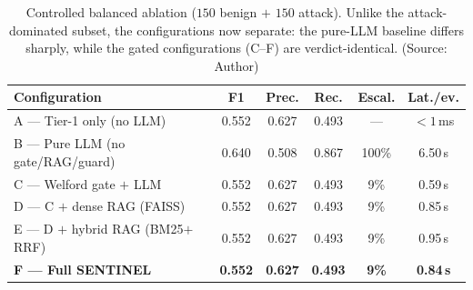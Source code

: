 \begin{table}[!htbp]
    \centering
    \footnotesize
    \setlength{\tabcolsep}{4pt}
    \caption{Controlled balanced ablation ($150$ benign $+$ $150$ attack). Unlike the attack-dominated subset, the configurations now separate: the pure-LLM baseline differs sharply, while the gated configurations (C--F) are verdict-identical. (Source: Author)}
    \label{tab:ablation_balanced}
    \begin{tabular}{|>{\raggedright\arraybackslash}p{}|c|c|c|c|c|}
        \hline
        \textbf{Configuration} & \textbf{F1} & \textbf{Prec.} & \textbf{Rec.} & \textbf{Escal.} & \textbf{Lat./ev.} \\
        \hline
        A --- Tier-1 only (no LLM) & 0.552 & 0.627 & 0.493 & --- & $<1$\,ms \\
        \hline
        B --- Pure LLM (no gate/RAG/guard) & 0.640 & 0.508 & 0.867 & 100\% & 6.50\,s \\
        \hline
        C --- Welford gate $+$ LLM & 0.552 & 0.627 & 0.493 & 9\% & 0.59\,s \\
        \hline
        D --- C $+$ dense RAG (FAISS) & 0.552 & 0.627 & 0.493 & 9\% & 0.85\,s \\
        \hline
        E --- D $+$ hybrid RAG (BM25$+$RRF) & 0.552 & 0.627 & 0.493 & 9\% & 0.95\,s \\
        \hline
        \textbf{F --- Full SENTINEL} & \textbf{0.552} & \textbf{0.627} & \textbf{0.493} & \textbf{9\%} & \textbf{0.84\,s} \\
        \hline
    \end{tabular}
\end{table}

